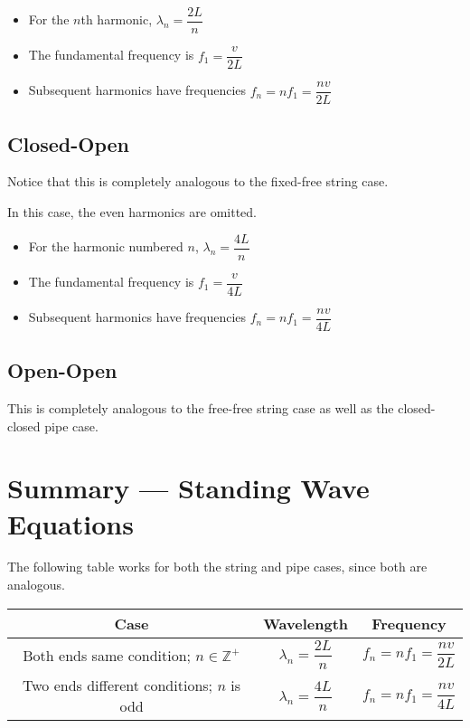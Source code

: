 \documentclass[a4paper,12pt]{article}
\let\oldsection\section
\renewcommand\section{\clearpage\oldsection}
\begin{document}
\begin{itemize}
  \item For the $n$th harmonic, $\lambda_n = \dfrac{2L}{n}$
  \item The fundamental frequency is $f_1 = \dfrac{v}{2L}$
  \item Subsequent harmonics have frequencies $f_n = nf_1 = \dfrac{nv}{2L}$
\end{itemize}

\subsection{Closed-Open}

Notice that this is completely analogous to the fixed-free string case.

In this case, the even harmonics are omitted.
\begin{itemize}
  \item For the harmonic numbered $n$, $\lambda_n = \dfrac{4L}{n}$
  \item The fundamental frequency is $f_1 = \dfrac{v}{4L}$
  \item Subsequent harmonics have frequencies $f_n = nf_1 = \dfrac{nv}{4L}$
\end{itemize}

\subsection{Open-Open}

This is completely analogous to the free-free string case as well as the closed-closed pipe case.

\section{Summary --- Standing Wave Equations}

The following table works for both the string and pipe cases, since both are analogous.

\begin{table}[H]
  \centering
  \def\arraystretch{1.5}
  \begin{tabular}{|c|c | c|}\hline
    Case                                           & Wavelength                  & Frequency                     \\ \hline
    Both ends same condition; $n \in \mathbb{Z}^+$ & $\lambda_n = \dfrac{2L}{n}$ & $f_n = nf_1 = \dfrac{nv}{2L}$ \\ \hline
    Two ends different conditions; $n$ is odd      & $\lambda_n = \dfrac{4L}{n}$ & $f_n = nf_1 = \dfrac{nv}{4L}$ \\ \hline
  \end{tabular}
\end{table}
\end{document}
